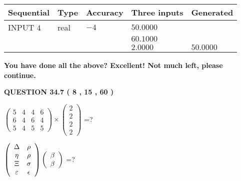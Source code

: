 \documentclass[12pt]{article}
\begin{document}
   
  
  
\noindent\begin{tabular}{|l|l|l|l|l|}
\hline
 Sequential & Type & Accuracy & Three inputs & Generated \\ 
\hline
 
 
  INPUT $            4 $ & real & $           -4  $ & $
 50.0000
  $ & \\
  & & &  $
 60.1000
  $ & \\
  & & &  $
 2.0000
 $ & $ 50.0000 $ 
 \\  \hline  
 \end{tabular}
   
   
   
   
\vspace{0.3in}
{\textbf{\LARGE{You have done all the above? Excellent! Not much left, please continue.}}}
\vspace{0.3in}
   
   
  
\vspace{0.2in}
  
{\textbf{\Large{QUESTION
34.7 
 (           8 ,          15 ,          60 )
}}}
  
  
 
$ \left( \begin{array}{ccccccccc}
           5  & 
           4  & 
           4  & 
           6  \\ 
           6  & 
           4  & 
           6  & 
           4  \\ 
           5  & 
           4  & 
           5  & 
           5
\end{array}\right) \times
\left( \begin{array}{c}
           2  \\ 
           2  \\ 
           2  \\ 
           2
\end{array}\right) $ =?
 
 
$  %
 \left( \begin{array}
 {
 c
 c
 }
 \Delta & 
 \rho \\ 
 \eta & 
 \rho \\ 
                    \Xi & 
 \sigma \\ 
 \varepsilon & 
 \epsilon
 \end{array} \right)
 \left( \begin{array}
 {
 c
 }
 \beta \\ 
 \beta
 \end{array} \right)
$ =?
 
\end{document}
